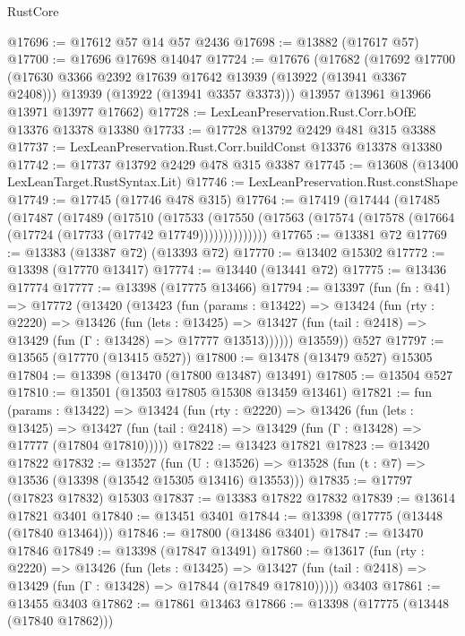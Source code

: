 \begin{lexlean}{RustCore}
\begin{coremodule}
@17696 := @17612 @57 @14 @57 @2436
@17698 := @13882 (@17617 @57)
@17700 := @17696 @17698 @14047
@17724 := @17676
    (@17682
      (@17692
        @17700
        (@17630 @3366 @2392 @17639 @17642 @13939 (@13922 (@13941 @3367 @2408)))
        @13939
        (@13922 (@13941 @3357 @3373)))
      @13957
      @13961
      @13966
      @13971
      @13977
      @17662)
@17728 := LexLeanPreservation.Rust.Corr.bOfE @13376 @13378 @13380
@17733 := @17728 @13792 @2429 @481 @315 @3388
@17737 := LexLeanPreservation.Rust.Corr.buildConst @13376 @13378 @13380
@17742 := @17737 @13792 @2429 @478 @315 @3387
@17745 := @13608 (@13400 LexLeanTarget.RustSyntax.Lit)
@17746 := LexLeanPreservation.Rust.constShape
@17749 := @17745 (@17746 @478 @315)
@17764 := @17419
    (@17444
      (@17485
        (@17487
          (@17489
            (@17510
              (@17533
                (@17550 (@17563 (@17574 (@17578 (@17664 (@17724 (@17733 (@17742 @17749))))))))))))))
@17765 := @13381 @72
@17769 := @13383 (@13387 @72) (@13393 @72)
@17770 := @13402 @15302
@17772 := @13398 (@17770 @13417)
@17774 := @13440 (@13441 @72)
@17775 := @13436 @17774
@17777 := @13398 (@17775 @13466)
@17794 := @13397
    (fun (fn : @41) =>
    @17772
      (@13420
        (@13423
          (fun (params : @13422) =>
          @13424
            (fun (rty : @2220) =>
            @13426
              (fun (lets : @13425) =>
              @13427 (fun (tail : @2418) => @13429 (fun (Γ : @13428) => @17777 @13513))))))
        @13559))
    @527
@17797 := @13565 (@17770 (@13415 @527))
@17800 := @13478 (@13479 @527) @15305
@17804 := @13398 (@13470 (@17800 @13487) @13491)
@17805 := @13504 @527
@17810 := @13501 (@13503 @17805 @15308 @13459 @13461)
@17821 := fun (params : @13422) =>
  @13424
    (fun (rty : @2220) =>
    @13426
      (fun (lets : @13425) =>
      @13427 (fun (tail : @2418) => @13429 (fun (Γ : @13428) => @17777 (@17804 @17810)))))
@17822 := @13423 @17821
@17823 := @13420 @17822
@17832 := @13527
    (fun (U : @13526) => @13528 (fun (t : @7) => @13536 (@13398 (@13542 @15305 @13416) @13553)))
@17835 := @17797 (@17823 @17832) @15303
@17837 := @13383 @17822 @17832
@17839 := @13614 @17821 @3401
@17840 := @13451 @3401
@17844 := @13398 (@17775 (@13448 (@17840 @13464)))
@17846 := @17800 (@13486 @3401)
@17847 := @13470 @17846
@17849 := @13398 (@17847 @13491)
@17860 := @13617
    (fun (rty : @2220) =>
    @13426
      (fun (lets : @13425) =>
      @13427 (fun (tail : @2418) => @13429 (fun (Γ : @13428) => @17844 (@17849 @17810)))))
    @3403
@17861 := @13455 @3403
@17862 := @17861 @13463
@17866 := @13398 (@17775 (@13448 (@17840 @17862)))

\end{coremodule}
\end{lexlean}
